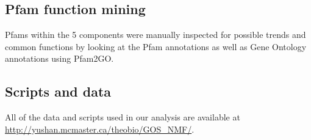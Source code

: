 \subsection{Pfam function mining}

Pfams within the 5 components were manually inspected for possible trends and common functions by looking at the Pfam annotations as well as Gene Ontology annotations using Pfam2GO.

\subsection{Scripts and data}

All of the data and scripts used in our analysis are available at \url{http://yushan.mcmaster.ca/theobio/GOS_NMF/}.

